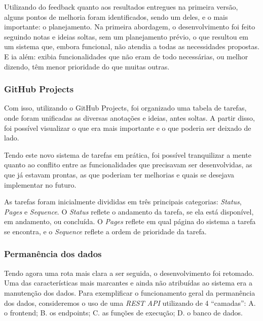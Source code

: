 Utilizando do feedback quanto aos resultados entregues na primeira versão, alguns pontos de melhoria foram identificados, sendo um deles, e o mais importante: o planejamento. Na primeira abordagem, o desenvolvimento foi feito seguindo notas e ideias soltas, sem um planejamento prévio, o que resultou em um sistema que, embora funcional, não atendia a todas as necessidades propostas. E ia além: exibia funcionalidades que não eram de todo necessárias, ou melhor dizendo, têm menor prioridade do que muitas outras.


\subsubsection{GitHub Projects}

Com isso, utilizando o GitHub Projects, foi organizado uma tabela de tarefas, onde foram unificadas as diversas anotações e ideias, antes soltas. A partir disso, foi possível visualizar o que era mais importante e o que poderia ser deixado de lado.


Tendo este novo sistema de tarefas em prática, foi possível tranquilizar a mente quanto ao conflito entre as funcionalidades que precisavam ser desenvolvidas, as que já estavam prontas, as que poderiam ter melhorias e quais se desejava implementar no futuro.

As tarefas foram inicialmente divididas em três principais categorias: \textit{Status}, \textit{Pages} e \textit{Sequence}. O \textit{Status} reflete o andamento da tarefa, se ela está disponível, em andamento, ou concluída. O \textit{Pages} reflete em qual página do sistema a tarefa se encontra, e o \textit{Sequence} reflete a ordem de prioridade da tarefa.

\subsubsection{Permanência dos dados}

Tendo agora uma rota mais clara a ser seguida, o desenvolvimento foi retomado. Uma das características mais marcantes e ainda não atribuídas ao sistema era a manutenção dos dados. Para exemplificar o funcionamento geral da permanência dos dados, consideremos o uso de uma \textit{REST API} utilizando de 4 ``camadas'': A. o frontend; B. os endpoints; C. as funções de execução; D. o banco de dados.

